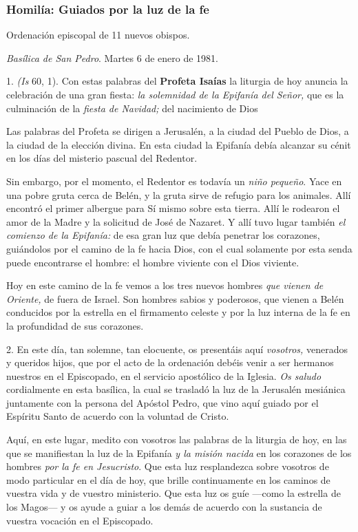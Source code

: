 \begin{body}
\begin{body}
\subsubsection{Homilía: Guiados por la luz de la fe}

Ordenación episcopal de 11 nuevos obispos.

\emph{Basílica de San Pedro}. Martes 6 de enero de 1981.

1.  \emph{(Is} 60, 1). Con estas palabras del \textbf{Profeta Isaías} la liturgia de hoy anuncia la celebración de una gran fiesta: \emph{la solemnidad de la Epifanía del Señor,} que es la culminación de la \emph{fiesta de Navidad;} del nacimiento de Dios

Las palabras del Profeta se dirigen a Jerusalén, a la ciudad del Pueblo de Dios, a la ciudad de la elección divina. En esta ciudad la Epifanía debía alcanzar su cénit en los días del misterio pascual del Redentor.

Sin embargo, por el momento, el Redentor es todavía un \emph{niño pequeño}. Yace en una pobre gruta cerca de Belén, y la gruta sirve de refugio para los animales. Allí encontró el primer albergue para Sí mismo sobre esta tierra. Allí le rodearon el amor de la Madre y la solicitud de José de Nazaret. Y allí tuvo lugar también \emph{el comienzo de la Epifanía:} de esa gran luz que debía penetrar los corazones, guiándolos por el camino de la fe hacia Dios, con el cual solamente por esta senda puede encontrarse el hombre: el hombre viviente con el Dios viviente.

Hoy en este camino de la fe vemos a los tres nuevos hombres \emph{que vienen de Oriente,} de fuera de Israel. Son hombres sabios y poderosos, que vienen a Belén conducidos por la estrella en el firmamento celeste y por la luz interna de la fe en la profundidad de sus corazones.

2. En este día, tan solemne, tan elocuente, os presentáis aquí \emph{vosotros,} venerados y queridos hijos, que por el acto de la ordenación debéis venir a ser hermanos nuestros en el Episcopado, en el servicio apostólico de la Iglesia. \emph{Os saludo} cordialmente en esta basílica, la cual se trasladó la luz de la Jerusalén mesiánica juntamente con la persona del Apóstol Pedro, que vino aquí guiado por el Espíritu Santo de acuerdo con la voluntad de Cristo.

Aquí, en este lugar, medito con vosotros las palabras de la liturgia de hoy, en las que se manifiestan la luz de la Epifanía \emph{y la misión nacida} en los corazones de los hombres \emph{por la fe en Jesucristo}. Que esta luz resplandezca sobre vosotros de modo particular en el día de hoy, que brille continuamente en los caminos de vuestra vida y de vuestro ministerio. Que esta luz os guíe ---como la estrella de los Magos--- y os ayude a guiar a los demás de acuerdo con la sustancia de vuestra vocación en el Episcopado.


\end{body}
\end{body}
